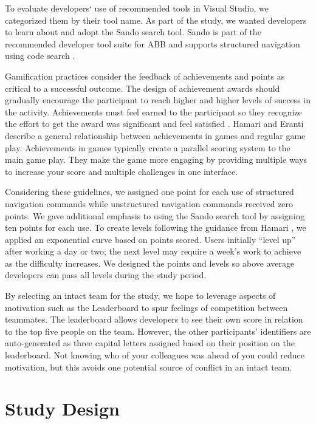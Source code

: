 \documentclass{sig-alternate}
\begin{document}
To evaluate developers` use of recommended tools in Visual Studio, we categorized them by their tool name.  As part of the study, we wanted developers to learn about and adopt the Sando search tool.  Sando is part of the recommended developer tool suite for ABB and supports structured navigation using code search \cite{Shepherd2012Sando}.

Gamification practices consider the feedback of achievements and points as critical to a successful outcome.  The design of achievement awards should gradually encourage the participant to reach higher and higher levels of success in the activity.  Achievements must feel earned to the participant so they recognize the effort to get the award was significant and feel satisfied  \cite{wbsnipes:Hamari2011Framework}.  Hamari and Eranti describe a general relationship between achievements in games and regular game play.     Achievements in games typically create a parallel scoring system to the main game play.  They make the game more engaging by providing multiple ways to increase your score and multiple challenges in one interface.

Considering these guidelines, we assigned one point for each use of structured navigation commands while unstructured navigation commands received zero points.    We gave additional emphasis to using the Sando search tool by assigning ten points for each use.  To create levels following the guidance from Hamari \cite{wbsnipes:Hamari2011Framework}, we applied an exponential curve based on points scored.  Users initially ``level up'' after  working a day or two; the next level may require a week's work to achieve as the difficulty increases.  We designed the points and levels so above average developers can pass all levels during the study period.

By selecting an intact team for the study, we hope to leverage aspects of motivation such as the Leaderboard to spur feelings of competition between teammates.    The leaderboard allows developers to see their own score in relation to the top five people on the team.  However, the other participants' identifiers are auto-generated as three capital letters assigned based on their position on the leaderboard.  Not knowing who of your colleagues was ahead of you could reduce motivation, but this avoids one potential source of conflict in an intact team.

\section {Study Design}
\end{document}
